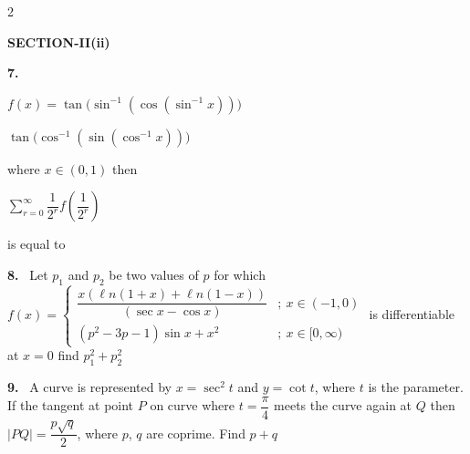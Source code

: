 \documentclass[10pt]{extarticle}
\newcommand{\sect}[1]{\par\smallskip\noindent\textbf{#1}\par}
\newcommand{\qn}[1]{\par\smallskip\noindent\textbf{#1.}~}
\begin{document}
\begin{multicols}{2}
\sect{SECTION-II(ii)}
\qn{7} \par\noindent\hfill{\small$f(x)=\tan\bigl(\sin^{-1}(\cos(\sin^{-1}x))\bigr)$}\hfill\null\par\noindent\hfill{\small$\tan\bigl(\cos^{-1}(\sin(\cos^{-1}x))\bigr)$}\hfill\null\par where $x\in(0,1)$ then\par\noindent\hfill{\small$\displaystyle\sum_{r=0}^{\infty}\dfrac{1}{2^r}f\left(\dfrac{1}{2^r}\right)$}\hfill\null\par is equal to
\qn{8} Let $p_1$ and $p_2$ be two values of $p$ for which $f(x)=\begin{cases}\dfrac{x\left(\ell n(1+x)+\ell n(1-x)\right)}{(\sec x-\cos x)} & ;\ x\in(-1,0)\\[2mm] \left(p^2-3p-1\right)\sin x+x^2 & ;\ x\in[0,\infty)\end{cases}$ is differentiable at $x=0$ find $p_1^2+p_2^2$
\qn{9} A curve is represented by $x=\sec^2t$ and $y=\cot t$, where $t$ is the parameter. If the tangent at point $P$ on curve where $t=\dfrac\pi4$ meets the curve again at $Q$ then $|PQ|=\dfrac{p\sqrt q}{2}$, where $p$, $q$ are coprime. Find $p+q$
\end{multicols}
\end{document}
